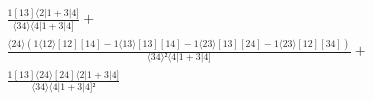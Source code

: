\documentclass[varwidth, border=5pt]{standalone}
\begin{document}
\begin{my}
$\begin{gathered}
\scriptscriptstyle\frac{1[13]⟨2|1+3|4]}{⟨34⟩⟨4|1+3|4]} +\\
\scriptscriptstyle\frac{⟨24⟩(1⟨12⟩[12][14]-1⟨13⟩[13][14]-1⟨23⟩[13][24]-1⟨23⟩[12][34])}{⟨34⟩²⟨4|1+3|4]} +\\
\scriptscriptstyle\frac{1[13]⟨24⟩[24]⟨2|1+3|4]}{⟨34⟩⟨4|1+3|4]²} \phantom{+}
\end{gathered}$
\end{my}
\end{document}
